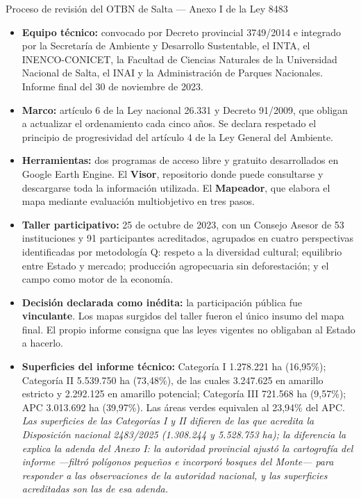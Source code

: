 \begin{ficha}{Proceso de revisión del OTBN de Salta --- Anexo I de la Ley 8483}
\begin{itemize}[leftmargin=*,nosep]
\item \textbf{Equipo técnico:} convocado por Decreto provincial 3749/2014 e integrado por la Secretaría de Ambiente y Desarrollo Sustentable, el INTA, el INENCO-CONICET, la Facultad de Ciencias Naturales de la Universidad Nacional de Salta, el INAI y la Administración de Parques Nacionales. Informe final del 30 de noviembre de 2023.
\item \textbf{Marco:} artículo 6 de la Ley nacional 26.331 y Decreto 91/2009, que obligan a actualizar el ordenamiento cada cinco años. Se declara respetado el principio de progresividad del artículo 4 de la Ley General del Ambiente.
\item \textbf{Herramientas:} dos programas de acceso libre y gratuito desarrollados en Google Earth Engine. El \textbf{Visor}, repositorio donde puede consultarse y descargarse toda la información utilizada. El \textbf{Mapeador}, que elabora el mapa mediante evaluación multiobjetivo en tres pasos.
\item \textbf{Taller participativo:} 25 de octubre de 2023, con un Consejo Asesor de 53 instituciones y 91 participantes acreditados, agrupados en cuatro perspectivas identificadas por metodología Q: respeto a la diversidad cultural; equilibrio entre Estado y mercado; producción agropecuaria sin deforestación; y el campo como motor de la economía.
\item \textbf{Decisión declarada como inédita:} la participación pública fue \textbf{vinculante}. Los mapas surgidos del taller fueron el único insumo del mapa final. El propio informe consigna que las leyes vigentes no obligaban al Estado a hacerlo.
\item \textbf{Superficies del informe técnico:} Categoría I 1.278.221 ha (16,95\%); Categoría II 5.539.750 ha (73,48\%), de las cuales 3.247.625 en amarillo estricto y 2.292.125 en amarillo potencial; Categoría III 721.568 ha (9,57\%); APC 3.013.692 ha (39,97\%). Las áreas verdes equivalen al 23,94\% del APC. \textit{Las superficies de las Categorías I y II difieren de las que acredita la Disposición nacional 2483/2025 (1.308.244 y 5.528.753 ha); la diferencia la explica la adenda del Anexo I: la autoridad provincial ajustó la cartografía del informe ---filtró polígonos pequeños e incorporó bosques del Monte--- para responder a las observaciones de la autoridad nacional, y las superficies acreditadas son las de esa adenda.}
\end{itemize}
\end{ficha}


